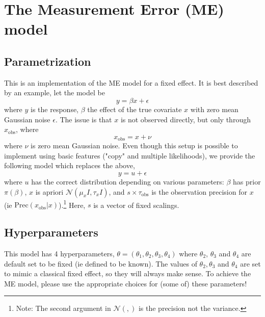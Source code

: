 \documentclass[a4paper,11pt]{article}
\begin{document}
\section*{The Measurement Error (ME) model}

\subsection*{Parametrization}

This is an implementation of the ME model for a fixed
effect. It is best described by an example, let  the model be
\begin{displaymath}
    y = \beta x + \epsilon{}
\end{displaymath}
where $y$ is the response, $\beta$ the effect of the true covariate
$x$ with zero mean Gaussian noise $\epsilon$. The issue is that $x$ is not observed
directly, but only through $x_{\text{obs}}$, where
\begin{displaymath}
    x_{\text{obs}} = x + \nu{}
\end{displaymath}
where $\nu$ is zero mean Gaussian noise. Even though this setup is
possible to implement using basic features ("copy" and multiple
likelihoods), we provide the following model which replaces the above,
\begin{displaymath}
    y = u + \epsilon{}
\end{displaymath}
where $u$ has the correct distribution depending on various parameters:
$\beta$ has prior $\pi(\beta)$, $x$ is apriori ${\mathcal N}(\mu_{x}
{I}, \tau_{x} {I})$, and $s\times\tau_{\text{obs}}$ is the observation
precision for $x$ (ie $\text{Prec}(x_{\text{obs}}|x)$).\footnote{Note:
    The second argument in ${\mathcal N}(,)$ is the precision not the
    variance.} Here, $s$ is a vector of fixed scalings.



\subsection*{Hyperparameters}

This model has 4 hyperparameters, $\theta = (\theta_{1}, \theta_{2},
\theta_{3}, \theta_{4})$ where $\theta_{2}$, $\theta_{3}$ and
$\theta_{4}$ are default set to be fixed (ie defined to be known). The
values of $\theta_{2}, \theta_{3}$ and $\theta_{4}$ are set to mimic a
classical fixed effect, so they will always make sense. To achieve the
ME model, please use the appropriate choices for
(some of) these parameters!
\end{document}
